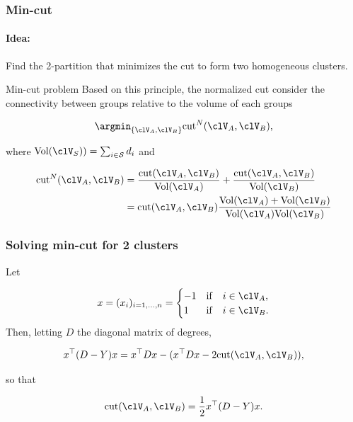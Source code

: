 \documentclass{beamer}\usepackage[]{graphicx}\usepackage[]{color}
\begin{document}
\begin{frame}
  \frametitle{Min-cut}
  
  \paragraph{Idea:} Find the 2-partition that minimizes the cut to form two homogeneous clusters.

  \begin{block}{Min-cut problem}
  Based on this principle, the normalized cut consider the connectivity between groups relative to the volume of each groups

$$\argmin_{\{\clV_A, \clV_B\}} \mathrm{cut}^{N}(\clV_A, \clV_B),$$

where $\mathrm{Vol}(\clV_S)) = \sum_{i\in\mathcal{S}} d_i$ and

$$
\begin{aligned}
\mathrm{cut}^{N}(\clV_A, \clV_B) & = \frac{\mathrm{cut}(\clV_A, \clV_B)}{\mathrm{Vol}(\clV_A)} + \frac{\mathrm{cut}(\clV_A, \clV_B)}{\mathrm{Vol}(\clV_B)} \\
 & =  \mathrm{cut}(\clV_A, \clV_B)\frac{\mathrm{Vol}(\clV_A) + \mathrm{Vol}(\clV_B)}{\mathrm{Vol}(\clV_A)\mathrm{Vol}(\clV_B)} \\
\end{aligned}
$$
  \end{block}
\end{frame}

\begin{frame}
  \frametitle{Solving min-cut for 2 clusters}
  
Let 

$$
x = (x_i)_{i=1,\dots,n} = 
\begin{cases}
-1 & \mathrm{if} \quad  i\in \clV_A, \\
 1 & \mathrm{if} \quad  i\in \clV_B. \\
\end{cases}
$$
Then, letting $D$ the diagonal matrix of degrees, 

$$
x^\top (D - Y) x = x^\top D x - ( x^\top D x - 2 \mathrm{cut} (\clV_A, \clV_B)),
$$

so that 

$$
\mathrm{cut} (\clV_A, \clV_B) = \frac12 x^\top (D - Y) x.
$$

\end{frame}
\end{document}
